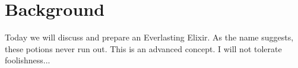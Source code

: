 \section{Background}
\label{sec:background}


Today we will discuss and prepare an Everlasting Elixir. As the name suggests, these potions never run out. This is an advanced concept. I will not tolerate foolishness...
